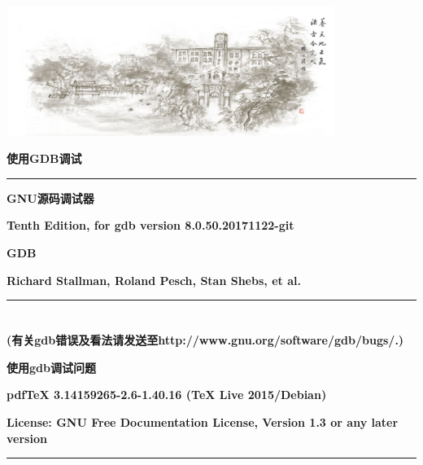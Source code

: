 \documentclass[class=book, crop=false]{standalone}
\begin{document}
\begin{CJK}{UTF8}{gbsn}
\begin{titlepage}
\centering
\includegraphics[width=0.8\textwidth]{title} \vspace{1cm}
\par

\begingroup
\fontsize{68pt}{22pt}\selectfont
\vspace{2ex}
\centering
{\fontsize{20}{15}\bfseries\scshape 使用GDB调试} \par
\rule{\textwidth}{1mm}

\vspace{1ex}
\raggedleft
{\bfseries\small GNU源码调试器\hspace{2em}} \par
{\bfseries\small Tenth Edition, for gdb version 8.0.50.20171122-git \hspace{2em}} \par
{\bfseries\small GDB \hspace{2em}} \par


\fontsize{68pt}{200pt}\selectfont
\vspace{2ex}
\centering
\raggedright
{\bfseries\small Richard Stallman, Roland Pesch, Stan Shebs, et al.\hspace{2em}} \par
\rule{\textwidth}{1mm}
\endgroup

 \par
{} \par
\end{titlepage}

\chapter*{}
\raggedleft
{\bfseries\small (有关gdb错误及看法请发送至http://www.gnu.org/software/gdb/bugs/.)} \par
{\bfseries\small 使用gdb调试问题} \par
{\bfseries\small pdfTeX 3.14159265-2.6-1.40.16 (TeX Live 2015/Debian)} \par
\begingroup
\fontsize{68pt}{320pt}\selectfont
\vspace{2ex}
\centering
\raggedright
{\bfseries\small License: GNU Free Documentation License, Version 1.3 or any later version} \par
\rule{\textwidth}{1mm}
\endgroup


\end{CJK}
\end{document}

